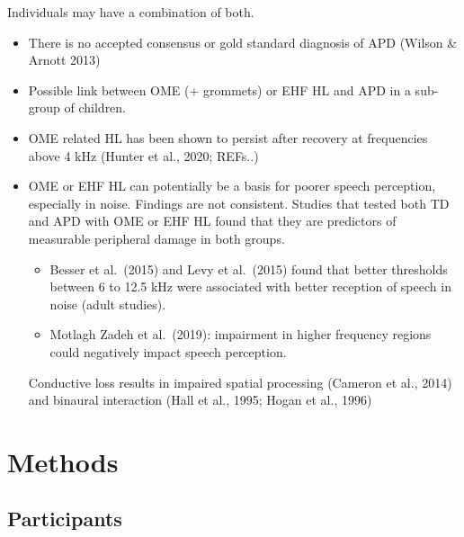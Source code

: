 \documentclass[a4paper, twoside]{templates/ociamthesis}
\providecommand{\tightlist}{%
  \setlength{\itemsep}{0pt}\setlength{\parskip}{0pt}}
\begin{document}
Individuals may have a combination of both.

\begin{itemize}
\item
  There is no accepted consensus or gold standard diagnosis of APD (Wilson \& Arnott 2013)
\item
  Possible link between OME (+ grommets) or EHF HL and APD in a sub-group of children.
\item
  OME related HL has been shown to persist after recovery at frequencies above 4 kHz (Hunter et al., 2020; REFs..)
\item
  OME or EHF HL can potentially be a basis for poorer speech perception, especially in noise. Findings are not consistent. Studies that tested both TD and APD with OME or EHF HL found that they are predictors of measurable peripheral damage in both groups.

  \begin{itemize}
  \tightlist
  \item
    Besser et al.~(2015) and Levy et al.~(2015) found that better thresholds between 6 to 12.5 kHz were associated with better reception of speech in noise (adult studies).
  \item
    Motlagh Zadeh et al.~(2019): impairment in higher frequency regions could negatively impact speech perception.
  \end{itemize}

  Conductive loss results in impaired spatial processing (Cameron et al., 2014) and binaural interaction (Hall et al., 1995; Hogan et al., 1996)
\end{itemize}

\hypertarget{methods-4}{%
\section{Methods}\label{methods-4}}

\hypertarget{participants-3}{%
\subsection{Participants}\label{participants-3}}
\end{document}
